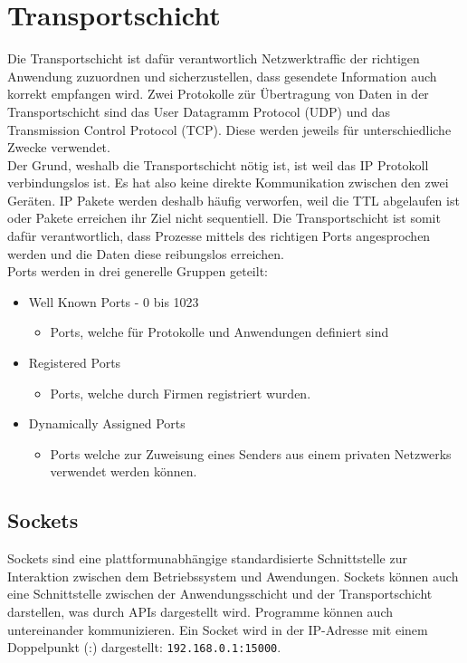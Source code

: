 \documentclass{article}
\begin{document}
	 \section{Transportschicht}
	 Die Transportschicht ist dafür verantwortlich Netzwerktraffic der richtigen Anwendung zuzuordnen und sicherzustellen, dass gesendete Information auch korrekt empfangen wird. Zwei Protokolle zür Übertragung von Daten in der Transportschicht sind das User Datagramm Protocol (UDP) und das Transmission Control Protocol (TCP). Diese werden jeweils für unterschiedliche Zwecke verwendet.\\
	 Der Grund, weshalb die Transportschicht nötig ist, ist weil das IP Protokoll verbindungslos ist. Es hat also keine direkte Kommunikation zwischen den zwei Geräten. IP Pakete werden deshalb häufig verworfen, weil die TTL abgelaufen ist oder Pakete erreichen ihr Ziel nicht sequentiell. Die Transportschicht ist somit dafür verantwortlich, dass Prozesse mittels des richtigen Ports angesprochen werden und die Daten diese reibungslos erreichen. \\
	 Ports werden in drei generelle Gruppen geteilt:
	 \begin{itemize}
	 	\item{Well Known Ports - 0 bis 1023}
	 	\begin{itemize}
	 		\item{Ports, welche für Protokolle und Anwendungen definiert sind}
	 	\end{itemize}
	 	\item{Registered Ports}
	 	\begin{itemize}
	 		\item{Ports, welche durch Firmen registriert wurden.}
	 	\end{itemize}
	 	\item{Dynamically Assigned Ports}
	 	\begin{itemize}
	 		\item{Ports welche zur Zuweisung eines Senders aus einem privaten Netzwerks verwendet werden können.}
	 	\end{itemize}
	 \end{itemize}
	 \subsection{Sockets}
	 Sockets sind eine plattformunabhängige standardisierte Schnittstelle zur Interaktion zwischen dem Betriebssystem und Awendungen. Sockets können auch eine Schnittstelle zwischen der Anwendungsschicht und der Transportschicht darstellen, was durch APIs dargestellt wird. Programme können auch untereinander kommunizieren. Ein Socket wird in der IP-Adresse mit einem Doppelpunkt (:) dargestellt: \verb|192.168.0.1:15000|.
\end{document}
